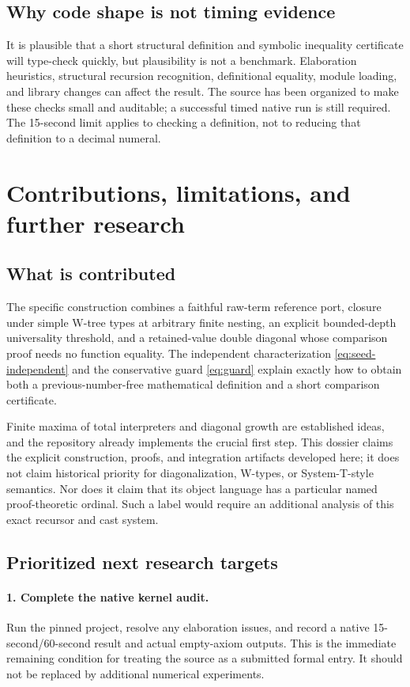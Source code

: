 \documentclass[11pt]{article}
\theoremstyle{definition}
\begin{document}
\subsection{Why code shape is not timing evidence}
It is plausible that a short structural definition and symbolic inequality
certificate will type-check quickly, but plausibility is not a benchmark.
Elaboration heuristics, structural recursion recognition, definitional equality,
module loading, and library changes can affect the result. The source has been
organized to make these checks small and auditable; a successful timed native
run is still required. The 15-second limit applies to checking a definition,
not to reducing that definition to a decimal numeral.

\section{Contributions, limitations, and further research}
\subsection{What is contributed}
The specific construction combines a faithful raw-term reference port, closure
under simple W-tree types at arbitrary finite nesting, an explicit
bounded-depth universality threshold, and a retained-value double diagonal
whose comparison proof needs no function equality. The independent
characterization \eqref{eq:seed-independent} and the conservative guard
\eqref{eq:guard} explain exactly how to obtain both a previous-number-free
mathematical definition and a short comparison certificate.

Finite maxima of total interpreters and diagonal growth are established ideas,
and the repository already implements the crucial first step. This dossier
claims the explicit construction, proofs, and integration artifacts developed
here; it does not claim historical priority for diagonalization, W-types, or
System-T-style semantics. Nor does it claim that its object language has a
particular named proof-theoretic ordinal. Such a label would require an
additional analysis of this exact recursor and cast system.

\subsection{Prioritized next research targets}
\paragraph{1. Complete the native kernel audit.}
Run the pinned project, resolve any elaboration issues, and record a native
15-second/60-second result and actual empty-axiom outputs. This is the immediate
remaining condition for treating the source as a submitted formal entry. It
should not be replaced by additional numerical experiments.
\end{document}
